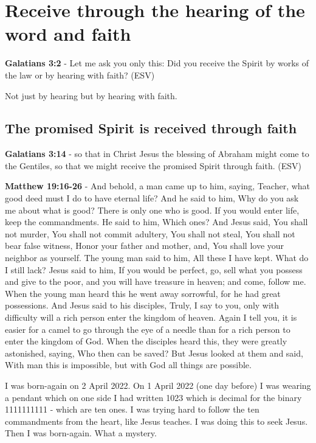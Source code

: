 \documentclass[11pt]{article}
\begin{document}
\section{Receive through the hearing of the word and faith}
\label{sec:orga6150c4}
\textbf{Galatians 3:2} - Let me ask you only this: Did you receive the Spirit by works of the law or by hearing with faith? (ESV)

Not just by hearing but by hearing with faith.

\subsection{The promised Spirit is received through faith}
\label{sec:orge0e466b}
\textbf{Galatians 3:14} - so that in Christ Jesus the blessing of Abraham might come to the Gentiles, so that we might receive the promised Spirit through faith. (ESV)

\textbf{Matthew 19:16-26} - And behold, a man came up to him, saying, Teacher, what good deed must I do to have eternal life? And he said to him, Why do you ask me about what is good? There is only one who is good. If you would enter life, keep the commandments. He said to him, Which ones? And Jesus said, You shall not murder, You shall not commit adultery, You shall not steal, You shall not bear false witness, Honor your father and mother, and, You shall love your neighbor as yourself. The young man said to him, All these I have kept. What do I still lack? Jesus said to him, If you would be perfect, go, sell what you possess and give to the poor, and you will have treasure in heaven; and come, follow me. When the young man heard this he went away sorrowful, for he had great possessions. And Jesus said to his disciples, Truly, I say to you, only with difficulty will a rich person enter the kingdom of heaven. Again I tell you, it is easier for a camel to go through the eye of a needle than for a rich person to enter the kingdom of God. When the disciples heard this, they were greatly astonished, saying, Who then can be saved? But Jesus looked at them and said, With man this is impossible, but with God all things are possible.

I was born-again on 2 April 2022. On 1 April 2022 (one day before) I was wearing a pendant which on one side I had written 1023 which is decimal for the binary 1111111111 - which are ten ones. I was trying hard to follow the ten commandments from the heart, like Jesus teaches. I was doing this to seek Jesus. Then I was born-again. What a mystery.
\end{document}
